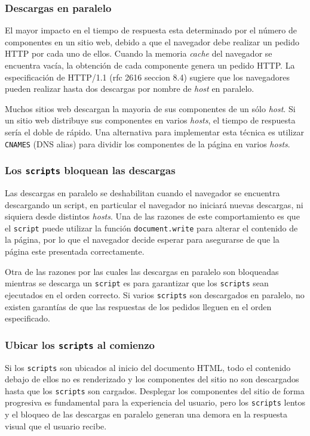 \documentclass[a4paper,12pt]{report}
\begin{document}
\subsubsection{Descargas en paralelo}

El mayor impacto en el tiempo de respuesta esta determinado por el número de componentes en un sitio web, debido a que el navegador debe realizar un pedido HTTP por cada uno de ellos.
Cuando la memoria \emph{cache} del navegador se encuentra vacía, la obtención de cada componente genera un pedido HTTP. La especificación de HTTP/1.1 (rfc 2616 \cite{rfc2616} seccion 8.4)
sugiere que los navegadores pueden realizar hasta dos descargas por nombre de \emph{host} en paralelo.

Muchos sitios web descargan la mayoria de sus componentes de un sólo \emph{host}. Si un sitio web distribuye sus componentes en varios \emph{hosts}, el tiempo de respuesta
sería el doble de rápido.
Una alternativa para implementar esta técnica es utilizar \texttt{CNAMES} (DNS alias) para dividir los componentes de la página en varios \emph{hosts}.

\subsubsection{Los \texttt{scripts} bloquean las descargas}

Las descargas en paralelo se deshabilitan cuando el navegador se encuentra descargando un script, en particular el navegador no iniciará nuevas descargas, ni siquiera
desde distintos \emph{hosts}. Una de las razones de este comportamiento es que el \texttt{script} puede utilizar la función \texttt{document.write} para alterar
el contenido de la página, por lo que el navegador decide esperar para asegurarse de que la página este presentada correctamente.

Otra de las razones por las cuales las descargas en paralelo son bloqueadas mientras se descarga un \texttt{script} es para garantizar que los \texttt{scripts} sean
ejecutados en el orden correcto. Si varios \texttt{scripts} son descargados en paralelo, no existen garantías de que las respuestas de los pedidos lleguen en el
orden especificado.

\subsubsection{Ubicar los \texttt{scripts} al comienzo}

Si los \texttt{scripts} son ubicados al inicio del documento HTML, todo el contenido debajo de ellos no es renderizado y los componentes del sitio no son descargados hasta que los \texttt{scripts} son cargados. Desplegar los componentes del sitio de forma progresiva es fundamental para la experiencia del
usuario, pero los \texttt{scripts} lentos y el bloqueo de las descargas en paralelo generan una demora en la respuesta visual que el usuario recibe.
\end{document}
